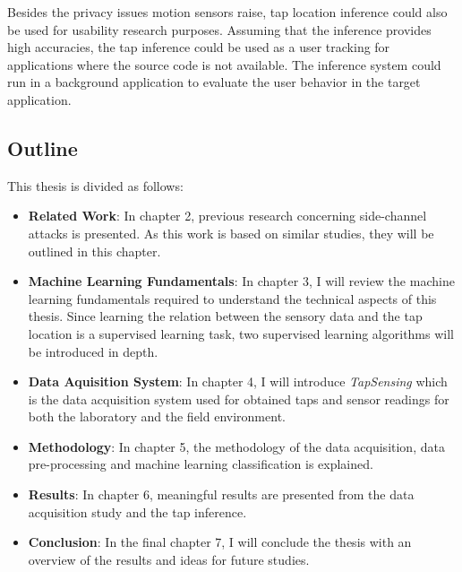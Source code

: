 
Besides the privacy issues motion sensors raise, tap location inference could also be used for usability research purposes. Assuming that the inference provides high accuracies, the tap inference could be used as a user tracking for applications where the source code is not available. The inference system could run in a background application to evaluate the user behavior in the target application.

\subsection{Outline}
This thesis is divided as follows:

\begin{itemize}
  \item \textbf{Related Work}: In chapter 2, previous research concerning side-channel attacks is presented. As this work is based on similar studies, they will be outlined in this chapter.
  \item \textbf{Machine Learning Fundamentals}: In chapter 3, I will review the machine learning fundamentals required to understand the technical aspects of this thesis. Since learning the relation between the sensory data and the tap location is a supervised learning task, two supervised learning algorithms will be introduced in depth.
  \item \textbf{Data Aquisition System}: In chapter 4, I will introduce \textit{TapSensing} which is the data acquisition system used for obtained taps and sensor readings for both the laboratory and the field environment.
  \item \textbf{Methodology}: In chapter 5, the methodology of the data acquisition, data pre-processing and machine learning classification is explained.
  \item \textbf{Results}: In chapter 6, meaningful results are presented from the data acquisition study and the tap inference.
  \item \textbf{Conclusion}: In the final chapter 7, I will conclude the thesis with an overview of the results and ideas for future studies.
\end{itemize}




